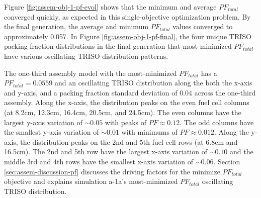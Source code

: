 Figure \ref{fig:assem-obj-1-pf-evol} shows that the minimum and average $PF_{total}$ 
converged quickly, as expected in this single-objective optimization problem.
By the final generation, the average and minimum $PF_{total}$
values converged to approximately 0.057. 
In Figure \ref{fig:assem-obj-1-pf-final}, the four unique TRISO packing fraction 
distributions in the final generation that most-minimized $PF_{total}$ have various 
oscillating TRISO distribution patterns. 

The one-third assembly model with the most-minimized $PF_{total}$ has a 
$PF_{total} =0.0559$ and an oscillating TRISO distribution along the both the 
x-axis and y-axis, and a packing fraction standard deviation of $0.04$ across the 
one-third assembly. 
Along the x-axis, the distribution peaks on the even fuel cell columns (at 8.2cm, 12.3cm, 
16.4cm, 20.5cm, and 24.5cm). 
The even columns have the largest y-axis variation of $\sim0.05$ with peaks of
$PF\approx0.12$.
The odd columns have the smallest y-axis variation of $\sim0.01$ with minimums of 
$PF\approx0.012$.
Along the y-axis, the distribution peaks on the 2nd and 5th fuel cell rows (at 6.8cm and 
16.5cm).
The 2nd and 5th row have the largest x-axis variation of $\sim0.10$ and the middle 3rd 
and 4th rows have the smallest x-axis variation of $\sim0.06$.
Section \ref{sec:assem-discussion-pf} discusses the driving factors for the minimize 
$PF_{total}$ objective and explains simulation a-1a's most-minimized $PF_{total}$ 
oscillating TRISO distribution. 

